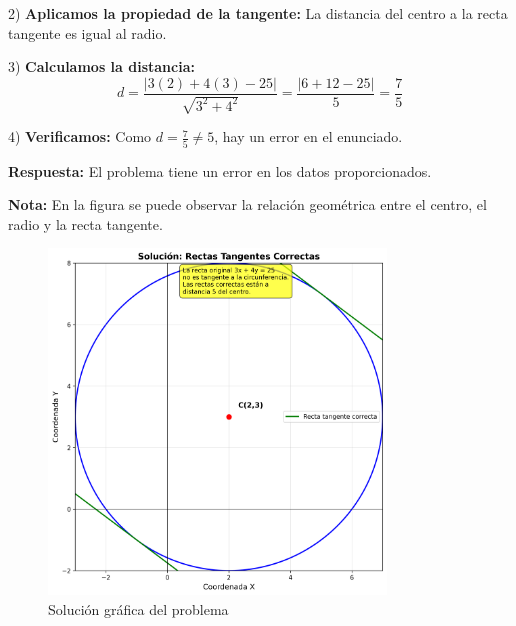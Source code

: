 \begin{ejercicio}
\begin{solucion}
2) \textbf{Aplicamos la propiedad de la tangente:}
   La distancia del centro a la recta tangente es igual al radio.

3) \textbf{Calculamos la distancia:}
   $$d = \frac{|3(2) + 4(3) - 25|}{\sqrt{3^2 + 4^2}} = \frac{|6 + 12 - 25|}{5} = \frac{7}{5}$$

4) \textbf{Verificamos:}
   Como $d = \frac{7}{5} \neq 5$, hay un error en el enunciado.

\textbf{Respuesta:} El problema tiene un error en los datos proporcionados.

\textbf{Nota:} En la figura se puede observar la relación geométrica entre el centro, el radio y la recta tangente.

\begin{figure}[h]
\centering
\includegraphics[width=0.8\textwidth]{imagenes/solucion_circulo_001.png}
\caption{Solución gráfica del problema}
\label{fig:solucion_circulo}
\end{figure}
\end{solucion}
\end{ejercicio}